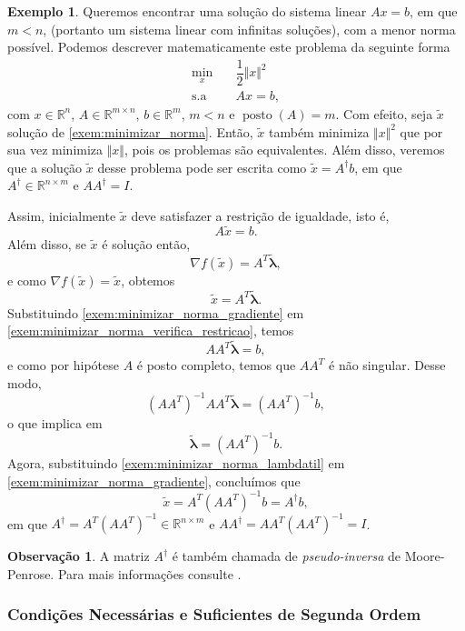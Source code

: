 \documentclass[12pt,a4paper]{scrartcl}
\DeclareMathOperator{\posto}{posto}
\def\RR{\mathds{R}}
\theoremstyle{definition}%
\newtheorem{exem}{Exemplo}
\newtheorem{obs}{Observação}
\begin{document}
\begin{exem} \label{exem:exemplo_minimizar_norma}
Queremos encontrar uma solução do sistema linear $Ax =b$, em que $m<n$, (portanto um sistema linear com infinitas soluções), com a menor norma possível. Podemos descrever matematicamente este problema da seguinte forma
\[\begin{aligned} \label{exem:minimizar_norma}
\min_{x} & \quad \dfrac{1}{2}\Vert x \Vert^{2} \\
\text{s.a} & \quad Ax=b,
\end{aligned} \]
com $x \in \RR^{n}$, $A \in \RR^{m\times n}$, $b\in \RR^{m}$, $m<n$ e $\posto (A)=m$. Com efeito, seja $\tilde{x}$ solução de \eqref{exem:minimizar_norma}. Então, $\tilde{x}$ também minimiza $\Vert x \Vert^{2}$ que por sua vez minimiza $\Vert x \Vert$, pois os problemas são equivalentes. Além disso, veremos que a solução $\tilde{x}$ desse problema pode ser escrita como $\tilde{x} = A^{\dag}b$, em que $A^{\dag} \in \RR^{n\times m}$ e $AA^{\dag} =I$.
\end{exem}
Assim, inicialmente $\tilde{x}$ deve satisfazer a restrição de igualdade, isto é,
\[ \label{exem:minimizar_norma_verifica_restricao}
A\tilde{x} = b .
\]
Além disso, se $\tilde{x}$ é solução então,
\[
\nabla f(\tilde{x}) =A^{T} \tilde{\boldsymbol{\lambda}},
\]
e como $\nabla f(\tilde{x}) = \tilde{x}$, obtemos 
\[ \label{exem:minimizar_norma_gradiente}
\tilde{x} = A^{T} \tilde{\boldsymbol{\lambda}} .
\]
Substituindo \eqref{exem:minimizar_norma_gradiente} em \eqref{exem:minimizar_norma_verifica_restricao}, temos
\[
AA^{T} \tilde{\boldsymbol{\lambda}} = b,
\]
e como por hipótese $A$ é posto completo, temos que $AA^{T}$ é não singular. Desse modo,
\[
(AA^{T})^{-1} AA^{T} \tilde{\boldsymbol{\lambda}} = (AA^{T})^{-1} b,
\]
o que implica em 
\[ \label{exem:minimizar_norma_lambdatil}
\tilde{\boldsymbol{\lambda}} = (AA^{T})^{-1} b.
\]
Agora, substituindo \eqref{exem:minimizar_norma_lambdatil} em \eqref{exem:minimizar_norma_gradiente}, concluímos que
\[
\tilde{x} = A^{T}(AA^{T})^{-1}b = A^{\dag} b,
\]
em que $A^{\dag} = A^{T}(AA^{T})^{-1} \in \RR^{n\times m}$ e $AA^{\dag} = AA^{T}(AA^{T})^{-1} = I$.

\begin{obs}
A matriz $A^{\dag}$ é também chamada de \emph{pseudo-inversa} de Moore-Penrose. Para mais informações consulte \textcite[p.423]{meyer2000matrix}.
\end{obs}


\subsubsection{Condições Necessárias e Suficientes de Segunda Ordem} \label{subsubsection:condicao_2ordem_igualdade}
\end{document}
